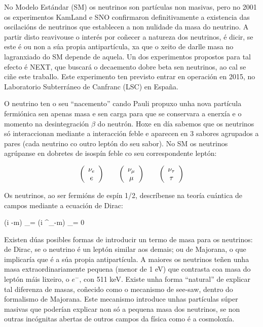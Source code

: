 \documentclass[a4paper,12pt]{article}
\begin{document}
No Modelo Estándar (SM) os neutrinos son partículas non masivas, pero no 2001 os experimentos KamLand e SNO confirmaron definitivamente a existencia das oscilacións de neutrinos que establecen a non nulidade da masa do neutrino. A partir disto reavivouse o interés por coñecer a natureza dos neutrinos, é dicir, se este é ou non a súa propia antipartícula, xa que o xeito de darlle masa no lagranxiado do SM depende de aquela. Un dos experimentos propostos para tal efecto é NEXT, que buscará o decaemento dobre beta sen neutrinos, ao cal se ciñe este traballo. Este experimento ten previsto entrar en operación en 2015, no Laboratorio Subterráneo de Canfranc (LSC) en España.

O neutrino ten o seu “nacemento” cando Pauli propuxo unha nova partícula fermiónica sen apenas masa e sen carga para que se conservara a enerxía e o momento na desintegración $\beta$ do neutrón. Hoxe en día sabemos que os neutrinos só interaccionan mediante a interacción feble e aparecen en 3 sabores agrupados a pares (cada neutrino co outro leptón do seu sabor). No SM os neutrinos agrúpanse en dobretes de isospín feble co seu correspondente leptón:

$$ \bmx{c} \nu_e \\ e \emx \qquad \bmx{c} \nu_\mu \\ \mu \emx \qquad \bmx{c} \nu_\tau \\ \tau \emx$$ 

Os neutrinos, ao ser fermións de espín 1/2, descríbense na teoría cuántica de campos mediante a ecuación de Dirac:

\beq
(i \slx\partial -m) \psi_\nu = (i \gamma^\mu \partial_\mu -m) \psi_\nu = 0
\eeq

Existen dúas posibles formas de introducir un termo de masa para os neutrinos: de Dirac, se o neutrino é un leptón similar aos demais; ou de Majorana, o que implicaría que é a súa propia antipartícula. A maiores os neutrinos teñen unha masa extraordinariamente pequena (menor de 1 eV) que contrasta coa masa do leptón máis lixeiro, o $e^-$, con 511 keV. Existe unha forma ``natural'' de explicar tal diferenza de masas, coñecido como o mecanismo de see-saw, dentro do formalismo de Majorana. Este mecanismo introduce unhas partículas súper masivas que poderían explicar non só a pequena masa dos neutrinos, se non outras incógnitas abertas de outros campos da física como é a cosmoloxía. %
\end{document}

